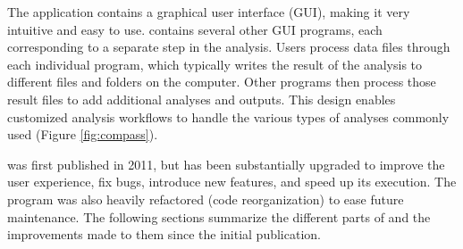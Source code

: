 The application contains a graphical user interface (GUI), making it very intuitive and easy to use. \compass{}  contains several other GUI programs, each corresponding to a separate step in the analysis. Users process data files through each individual program, which typically writes the result of the analysis to different files and folders on the computer. Other programs then process those result files to add additional analyses and outputs. This design enables customized analysis workflows to handle the various types of analyses commonly used (Figure \ref{fig:compass}).

\compass{} was first published in 2011, but has been substantially upgraded to improve the user experience, fix bugs, introduce new features, and speed up its execution. The program was also heavily refactored (code reorganization) to ease future maintenance. The following sections summarize the different parts of \compass{} and the improvements made to them since the initial publication.
 
